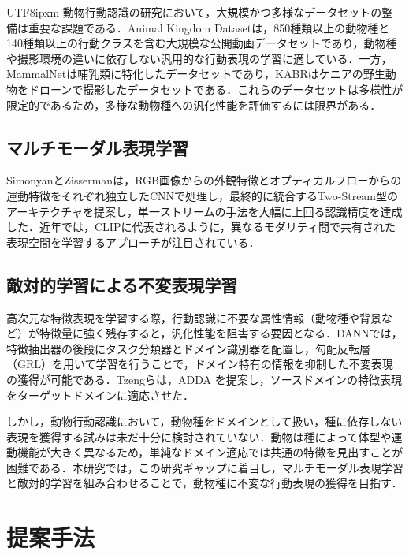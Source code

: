 \documentclass[twocolumn]{svjour3}
\begin{document}
\begin{CJK}{UTF8}{ipxm}
動物行動認識の研究において，大規模かつ多様なデータセットの整備は重要な課題である．Animal Kingdom Dataset\cite{ng2022animal}は，850種類以上の動物種と140種類以上の行動クラスを含む大規模な公開動画データセットであり，動物種や撮影環境の違いに依存しない汎用的な行動表現の学習に適している．一方，MammalNet\cite{mammalnet}は哺乳類に特化したデータセットであり，KABR\cite{kabr}はケニアの野生動物をドローンで撮影したデータセットである．これらのデータセットは多様性が限定的であるため，多様な動物種への汎化性能を評価するには限界がある．

\subsection{マルチモーダル表現学習}

SimonyanとZisserman\cite{simonyan2014two}は，RGB画像からの外観特徴とオプティカルフローからの運動特徴をそれぞれ独立したCNNで処理し，最終的に統合するTwo-Stream型のアーキテクチャを提案し，単一ストリームの手法を大幅に上回る認識精度を達成した．近年では，CLIP\cite{radford2021clip}に代表されるように，異なるモダリティ間で共有された表現空間を学習するアプローチが注目されている．

\subsection{敵対的学習による不変表現学習}

高次元な特徴表現を学習する際，行動認識に不要な属性情報（動物種や背景など）が特徴量に強く残存すると，汎化性能を阻害する要因となる．DANN\cite{ganin2016domain}では，特徴抽出器の後段にタスク分類器とドメイン識別器を配置し，勾配反転層（GRL）を用いて学習を行うことで，ドメイン特有の情報を抑制した不変表現の獲得が可能である．Tzengら\cite{tzeng2017adversarial}は，ADDA を提案し，ソースドメインの特徴表現をターゲットドメインに適応させた．

しかし，動物行動認識において，動物種をドメインとして扱い，種に依存しない表現を獲得する試みは未だ十分に検討されていない．動物は種によって体型や運動機能が大きく異なるため，単純なドメイン適応では共通の特徴を見出すことが困難である．本研究では，この研究ギャップに着目し，マルチモーダル表現学習と敵対的学習を組み合わせることで，動物種に不変な行動表現の獲得を目指す．

\section{提案手法}
\label{sec:method}


\end{CJK}
\end{document}
